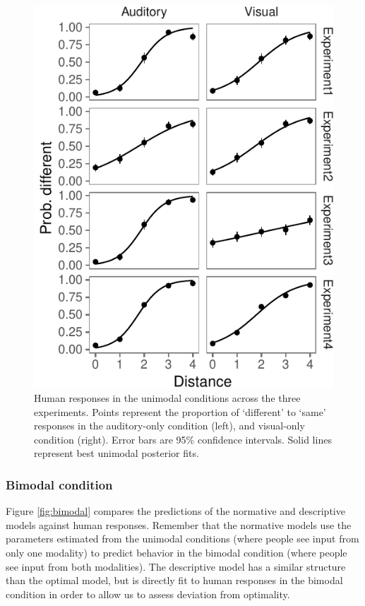 \documentclass[english,,man,floatsintext]{apa6}
\theoremstyle{definition}
\theoremstyle{definition}
\theoremstyle{definition}
\theoremstyle{remark}
\begin{document}
\begin{figure}[!h]
\includegraphics[width=\textwidth]{ms_files/figure-latex/unimodal-1} \caption{Human responses in the unimodal conditions across the three experiments. Points represent the proportion of `different' to `same' responses in the auditory-only condition (left), and visual-only condition (right). Error bars are 95\% confidence intervals. Solid lines represent best unimodal posterior fits.}\label{fig:unimodal}
\end{figure}

\subsubsection{Bimodal condition}\label{bimodal-condition-1}

Figure \ref{fig:bimodal} compares the predictions of the normative and
descriptive models against human responses. Remember that the normative
models use the parameters estimated from the unimodal conditions (where
people see input from only one modality) to predict behavior in the
bimodal condition (where people see input from both modalities). The
descriptive model has a similar structure than the optimal model, but is
directly fit to human responses in the bimodal condition in order to
allow us to assess deviation from optimality.
\end{document}
